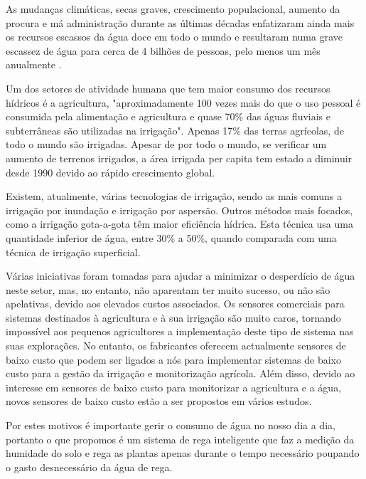 \documentclass[conference]{IEEEtran}
\begin{document}
As mudanças climáticas, secas graves, crescimento populacional, aumento da procura e má 
administração durante as últimas décadas enfatizaram ainda mais os recursos escassos da água 
doce em todo o mundo e resultaram numa grave escassez de água para cerca de 4 bilhões de pessoas, 
pelo menos um mês anualmente \cite{jafari2018assessing} \cite{unicef2019progress} \cite{orimoloye2021spatial}. \cite{salehi2022global}

Um dos setores de atividade humana que tem maior consumo dos recursos hídricos é a agricultura, 
"aproximadamente 100 vezes mais do que o uso pessoal é consumida pela alimentação e agricultura 
e quase 70\% das águas fluviais e subterrâneas são utilizadas na irrigação". \cite{nawandar2019iot} 
Apenas 17\% das terras agrícolas, de todo o mundo são irrigadas. Apesar de por todo o mundo, se verificar 
um aumento de terrenos irrigados, a área irrigada per capita tem estado a diminuir desde 1990 
devido ao rápido crescimento global. \cite{pimentelwater}

Existem, atualmente, várias tecnologias de irrigação, sendo as mais comuns a irrigação por inundação e irrigação 
por aspersão. Outros métodos mais focados, como a irrigação gota-a-gota têm maior eficiência hídrica. Esta 
técnica usa uma quantidade inferior de água, entre 30\% a 50\%, quando comparada com uma técnica de 
irrigação superficial. \cite{pimentelwater}

Várias iniciativas foram tomadas para ajudar a minimizar o desperdício de água neste setor, 
mas, no entanto, não aparentam ter muito sucesso, ou não são apelativas, devido aos 
elevados custos associados. Os sensores comerciais para sistemas destinados à 
agricultura e à sua irrigação são muito caros, tornando impossível aos pequenos 
agricultores a implementação deste tipo de sistema nas suas explorações. 
No entanto, os fabricantes oferecem actualmente sensores de baixo custo que podem 
ser ligados a nós para implementar sistemas de baixo custo para a gestão da 
irrigação e monitorização agrícola. Além disso, devido ao interesse em sensores de 
baixo custo para monitorizar a agricultura e a água, 
novos sensores de baixo custo estão a ser propostos em vários estudos. \cite{garcia2020iot}

Por estes motivos é importante gerir o consumo de água no nosso dia a dia, portanto o que 
propomos é um sistema de rega inteligente que faz a medição da humidade do solo e rega 
as plantas apenas durante o tempo necessário poupando o gasto desnecessário da água de rega.
\end{document}
